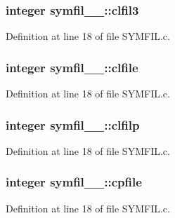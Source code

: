 \subsubsection[{\texorpdfstring{clfil3}{clfil3}}]{\setlength{\rightskip}{0pt plus 5cm}integer symfil\+\_\+\_\+\+::clfil3}\hypertarget{structsymfil__1___a50d192813f149b8b93f9d708e3f5ef9e}{}\label{structsymfil__1___a50d192813f149b8b93f9d708e3f5ef9e}


Definition at line 18 of file S\+Y\+M\+F\+I\+L.\+c.

\subsubsection[{\texorpdfstring{clfile}{clfile}}]{\setlength{\rightskip}{0pt plus 5cm}integer symfil\+\_\+\_\+\+::clfile}\hypertarget{structsymfil__1___a0545f935bcab324df9ce805e04cf2be3}{}\label{structsymfil__1___a0545f935bcab324df9ce805e04cf2be3}


Definition at line 18 of file S\+Y\+M\+F\+I\+L.\+c.

\subsubsection[{\texorpdfstring{clfilp}{clfilp}}]{\setlength{\rightskip}{0pt plus 5cm}integer symfil\+\_\+\_\+\+::clfilp}\hypertarget{structsymfil__1___a03ee4728d8625aca0fa2793bd29d6d59}{}\label{structsymfil__1___a03ee4728d8625aca0fa2793bd29d6d59}


Definition at line 18 of file S\+Y\+M\+F\+I\+L.\+c.

\subsubsection[{\texorpdfstring{cpfile}{cpfile}}]{\setlength{\rightskip}{0pt plus 5cm}integer symfil\+\_\+\_\+\+::cpfile}\hypertarget{structsymfil__1___a3a064053ad970c80804b9969a1217396}{}\label{structsymfil__1___a3a064053ad970c80804b9969a1217396}


Definition at line 18 of file S\+Y\+M\+F\+I\+L.\+c.

